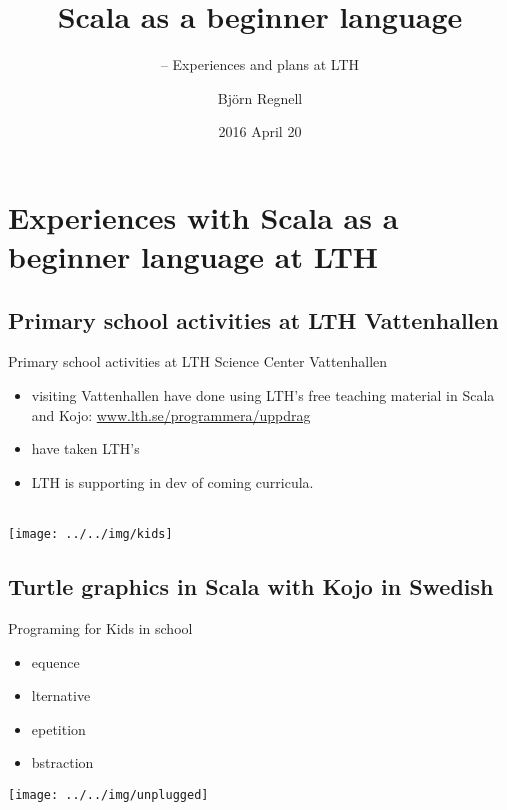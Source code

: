 \documentclass{lecturenotes}
\title[Scala as a beginner language]{Scala as a beginner language}
\subtitle{-- Experiences and plans at LTH}
\author{Björn Regnell}
\institute{Dept. of Computer Science, LTH \\ Lund University, Sweden}
\date{2016 April 20}
\begin{document}
\frame{\titlepage}


\section[Experiences with Scala at LTH]{Experiences with Scala as a beginner language at LTH}

\subsection[Scala at LTH Science Center Vattenhallen]{Primary school activities at LTH Vattenhallen}

\begin{Slide}{Primary school activities at LTH Science Center Vattenhallen}
\begin{multicols}{2}

\footnotesize
\begin{itemize}
\item {} visiting Vattenhallen have done  using LTH's free teaching material in Scala and Kojo:
\href{http://www.lth.se/programmera/uppdrag}{www.lth.se/programmera/uppdrag} \\ 

\item {} have taken LTH's  

\item LTH is supporting  in dev of coming curricula. \\\\ 




\end{itemize}
\columnbreak
\texttt{[image: ../../img/kids]}
\end{multicols}

\end{Slide}

\subsection[Turtle graphics in Scala with Kojo]{Turtle graphics in Scala with Kojo in Swedish}

\begin{Slide}{Programing for Kids in school}
\begin{multicols}{3}
\begin{itemize}
\item {}equence
\item {}lternative
\item {}epetition
\item {}bstraction
\end{itemize}
\columnbreak
\texttt{[image: ../../img/unplugged]}
\end{multicols}
\end{Slide}
\end{document}
